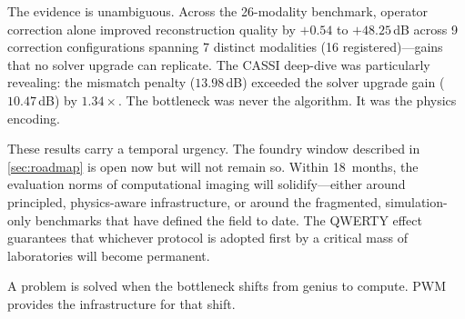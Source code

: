 The evidence is unambiguous.  Across the 26-modality benchmark,
operator correction alone improved reconstruction quality by $+0.54$ to
$+48.25$\,dB across 9 correction configurations spanning 7 distinct modalities (16 registered)---gains that no solver upgrade can
replicate.  The CASSI deep-dive was particularly revealing: the mismatch
penalty ($13.98$\,dB) exceeded the solver upgrade gain ($10.47$\,dB) by
$1.34\times$.  The bottleneck was never the
algorithm.  It was the physics encoding.

These results carry a temporal urgency.  The foundry window described in
\cref{sec:roadmap} is open now but will not remain so.  Within
18~months, the evaluation norms of computational imaging will
solidify---either around principled, physics-aware infrastructure, or
around the fragmented, simulation-only benchmarks that have defined the
field to date.  The QWERTY effect guarantees that whichever protocol is
adopted first by a critical mass of laboratories will become permanent.

\medskip
\noindent
A problem is solved when the bottleneck shifts from genius to compute.
PWM provides the infrastructure for that shift.
